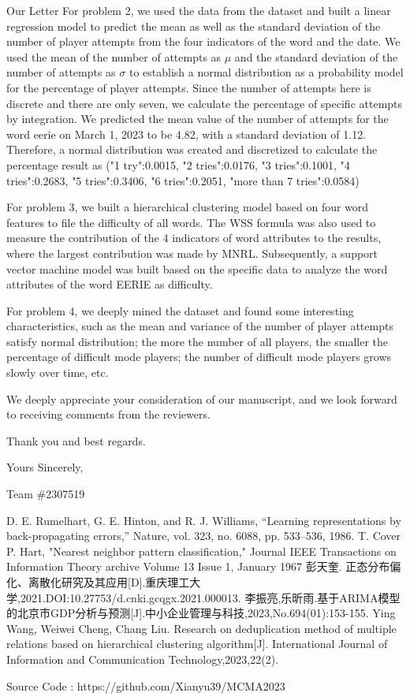 \documentclass[12pt]{article}  %
\begin{document}
\begin{letter}{Our Letter}
For problem 2, we used the data from the dataset and built a linear regression model to predict the mean as well as the standard deviation of the number of player attempts from the four indicators of the word and the date. We used the mean of the number of attempts as $\mu$ and the standard deviation of the number of attempts as $\sigma$ to establish a normal distribution as a probability model for the percentage of player attempts. Since the number of attempts here is discrete and there are only seven, we calculate the percentage of specific attempts by integration. We predicted the mean value of the number of attempts for the word eerie on March 1, 2023 to be 4.82, with a standard deviation of 1.12. Therefore, a normal distribution was created and discretized to calculate the percentage result as ("1 try":0.0015, "2 tries":0.0176, "3 tries":0.1001, "4 tries":0.2683, "5 tries":0.3406, "6 tries":0.2051, "more than 7 tries":0.0584)

For problem 3, we built a hierarchical clustering model based on four word features to file the difficulty of all words. The WSS formula was also used to measure the contribution of the 4 indicators of word attributes to the results, where the largest contribution was made by MNRL. Subsequently, a support vector machine model was built based on the specific data to analyze the word attributes of the word EERIE as difficulty.

For problem 4, we deeply mined the dataset and found some interesting characteristics, such as the mean and variance of the number of player attempts satisfy normal distribution; the more the number of all players, the smaller the percentage of difficult mode players; the number of difficult mode players grows slowly over time, etc.

We deeply appreciate your consideration of our manuscript, and we look forward to receiving comments from the reviewers. 

Thank you and best regards.


\hfill Yours Sincerely,

\hfill Team $\#$2307519  
\end{letter}

\begin{thebibliography}{99}
	 D. E. Rumelhart, G. E. Hinton, and R. J. Williams, “Learning representations by back-propagating errors,” Nature, vol. 323, no. 6088, pp. 533–536, 1986.
	 T. Cover  P. Hart, "Nearest neighbor pattern classification," Journal IEEE Transactions on Information Theory archive Volume 13 Issue 1, January 1967
	 彭天奎. 正态分布偏化、离散化研究及其应用[D].重庆理工大学,2021.DOI:10.27753/d.cnki.gcqgx.2021.000013.
	 李振亮,乐昕雨.基于ARIMA模型的北京市GDP分析与预测[J].中小企业管理与科技,2023,No.694(01):153-155.
	 Ying Wang, Weiwei Cheng, Chang Liu. Research on deduplication method of multiple relations based on hierarchical clustering algorithm[J]. International Journal of Information and Communication Technology,2023,22(2).
	\end{thebibliography}

\begin{appendices}
	Source Code : https://github.com/Xianyu39/MCMA2023
\end{appendices}
\end{document}
